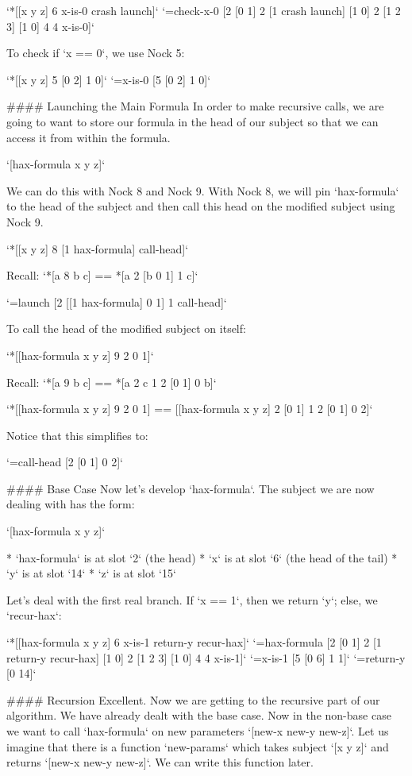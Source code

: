 \documentclass[twoside]{article}
\begin{document}
`*[[x y z] 6 x-is-0 crash launch]`  
`=check-x-0 [2 [0 1] 2 [1 crash launch] [1 0] 2 [1 2 3] [1 0] 4 4 x-is-0]`

To check if `x == 0`, we use Nock 5:

`*[[x y z] 5 [0 2] 1 0]`  
`=x-is-0 [5 [0 2] 1 0]`

#### Launching the Main Formula
In order to make recursive calls, we are going to want to store our formula in the head of our subject so that we can access it from within the formula.

`[hax-formula x y z]`  

We can do this with Nock 8 and Nock 9. With Nock 8, we will pin `hax-formula` to the head of the subject and then call this head on the modified subject using Nock 9.

`*[[x y z] 8 [1 hax-formula] call-head]`  

Recall: `*[a 8 b c] == *[a 2 [b 0 1] 1 c]`  

`=launch [2 [[1 hax-formula] 0 1] 1 call-head]`

To call the head of the modified subject on itself:

`*[[hax-formula x y z] 9 2 0 1]`

Recall: `*[a 9 b c] == *[a 2 c 1 2 [0 1] 0 b]`  

`*[[hax-formula x y z] 9 2 0 1] == [[hax-formula x y z] 2 [0 1] 1 2 [0 1] 0 2]`

Notice that this simplifies to:

`=call-head [2 [0 1] 0 2]`

#### Base Case
Now let's develop `hax-formula`. The subject we are now dealing with has the form:

`[hax-formula x y z]`  

* `hax-formula` is at slot `2` (the head)
* `x` is at slot `6` (the head of the tail)
* `y` is at slot `14`
* `z` is at slot `15`

Let's deal with the first real branch.  If `x == 1`, then we return `y`; else, we `recur-hax`:

`*[[hax-formula x y z] 6 x-is-1 return-y recur-hax]`  
`=hax-formula [2 [0 1] 2 [1 return-y recur-hax] [1 0] 2 [1 2 3] [1 0] 4 4 x-is-1]`  
`=x-is-1 [5 [0 6] 1 1]`  
`=return-y [0 14]`

#### Recursion
Excellent. Now we are getting to the recursive part of our algorithm. We have already dealt with the base case. Now in the non-base case we want to call `hax-formula` on new parameters `[new-x new-y new-z]`. Let us imagine that there is a function `new-params` which takes subject `[x y z]` and returns `[new-x new-y new-z]`.  We can write this function later.
\end{document}
